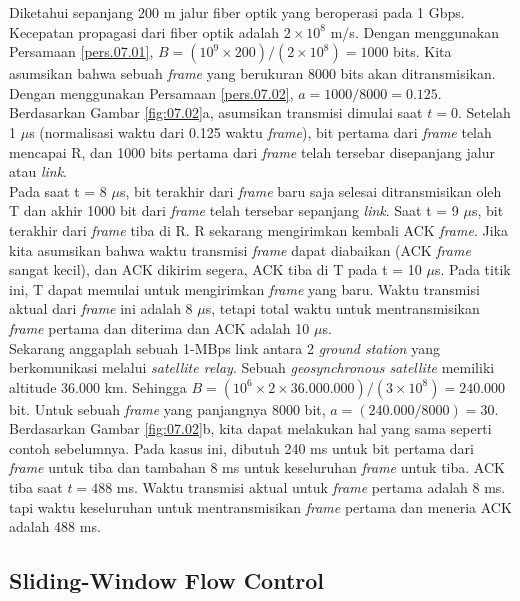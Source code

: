 \begin{exmp}\label{exp:07.01}
	Diketahui sepanjang 200 m jalur fiber optik yang beroperasi pada 1 Gbps. Kecepatan propagasi dari fiber optik adalah $ 2 \times 10^8 $ m/s. Dengan menggunakan Persamaan \ref{pers.07.01}, $ B = (10^9 \times 200) / (2 \times 10^8) = 1000 $ bits. Kita asumsikan bahwa sebuah \textit{frame} yang berukuran 8000 bits akan ditransmisikan. Dengan menggunakan Persamaan \ref{pers.07.02}, $ a = 1000/8000 = 0.125 $. Berdasarkan Gambar \ref{fig:07.02}a, asumsikan transmisi dimulai saat $ t = 0 $. Setelah 1 $ \mu $s (normalisasi waktu dari 0.125 waktu \textit{frame}), bit pertama dari \textit{frame} telah mencapai R, dan 1000 bits pertama dari \textit{frame} telah tersebar disepanjang jalur atau \textit{link}.\\
	\indent Pada saat t = 8 $\mu$s, bit terakhir dari \textit{frame} baru saja selesai ditransmisikan oleh T dan akhir 1000 bit dari \textit{frame} telah tersebar sepanjang \textit{link}. Saat t = 9 $\mu$s, bit terakhir dari \textit{frame} tiba di R. R sekarang mengirimkan kembali ACK \textit{frame}. Jika kita asumsikan bahwa waktu transmisi \textit{frame} dapat diabaikan (ACK \textit{frame} sangat kecil), dan ACK dikirim segera, ACK tiba di T pada t = 10 $\mu$s. Pada titik ini, T dapat memulai untuk mengirimkan \textit{frame} yang baru. Waktu transmisi aktual dari \textit{frame} ini adalah 8 $\mu$s, tetapi total waktu untuk mentransmisikan \textit{frame} pertama dan diterima dan ACK adalah 10 $\mu$s.\\
	\indent Sekarang anggaplah sebuah 1-MBps link antara 2 \textit{ground station} yang berkomunikasi melalui \textit{satellite relay}. Sebuah \textit{geosynchronous satellite} memiliki altitude 36.000 km. Sehingga $ B = (10^6 \times 2 \times 36.000.000)/(3 \times 10^8) = 240.000 $ bit. Untuk sebuah \textit{frame} yang panjangnya 8000 bit, $ a = (240.000 / 8000) = 30 $. Berdasarkan Gambar \ref{fig:07.02}b, kita dapat melakukan hal yang sama seperti contoh sebelumnya. Pada kasus ini, dibutuh 240 ms untuk bit pertama dari \textit{frame} untuk tiba dan tambahan 8 ms untuk keseluruhan \textit{frame} untuk tiba. ACK tiba saat $ t = 488 $ ms. Waktu transmisi aktual untuk \textit{frame} pertama adalah 8 ms. tapi waktu keseluruhan untuk mentransmisikan \textit{frame} pertama dan meneria ACK adalah 488 ms.
\end{exmp}


\subsection{Sliding-Window Flow Control}


